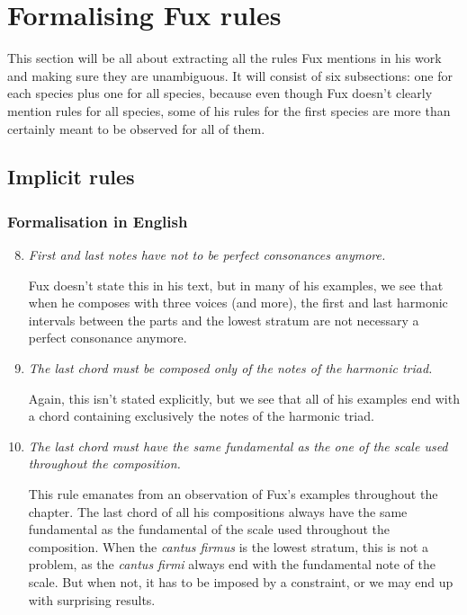 \chapter{Formalising Fux rules}
This section will be all about extracting all the rules Fux mentions in his work and making sure they are unambiguous.
It will consist of six subsections: one for each species plus one for all species, because even though Fux doesn't clearly mention rules for all species, some of his rules for the first species are more than certainly meant to be observed for all of them. 
\section{Implicit rules}
\subsection{Formalisation in English} \label{sec:generalenglish}
\begin{enumerate}[wide, label=\bfseries G\arabic*]
    \setcounter{enumi}{7} %
    \item \textit{First and last notes have not to be perfect consonances anymore.} \label{rule:last-chord-not-perfect-anymore}    
    
    Fux doesn't state this in his text, but in many of his examples, we see that when he composes with three voices (and more), the first and last harmonic intervals between the parts and the lowest stratum are not necessary a perfect consonance anymore.

    \item \textit{The last chord must be composed only of the notes of the harmonic triad.} \label{rule:last-chord-h-triad}

    Again, this isn't stated explicitly, but we see that all of his examples end with a chord containing exclusively the notes of the harmonic triad.
    
    \item \textit{The last chord must have the same fundamental as the one of the scale used throughout the composition.}\label{rule:same-fundamental}

    This rule emanates from an observation of Fux's examples throughout the chapter. The last chord of all his compositions always have the same fundamental as the fundamental of the scale used throughout the composition.
    When the \textit{cantus firmus} is the lowest stratum, this is not a problem, as the \textit{cantus firmi} always end with the fundamental note of the scale. But when not, it has to be imposed by a constraint, or we may end up with surprising results.
\end{enumerate}

